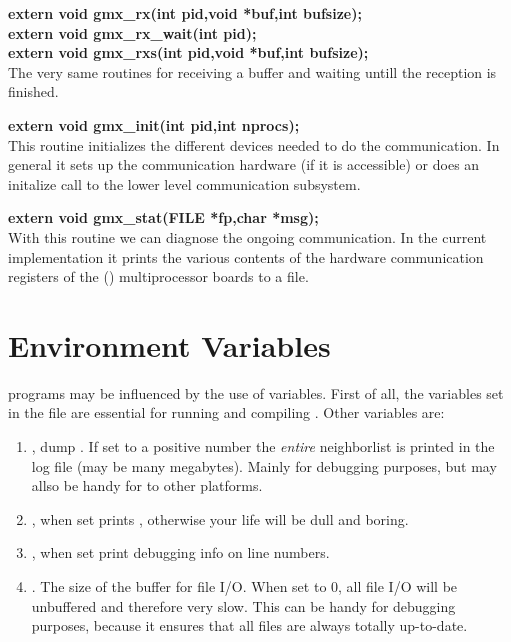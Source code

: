 \smallskip

{\bf extern void gmx\_rx(int pid,void *buf,int bufsize);}\\
{\bf extern void gmx\_rx\_wait(int pid);}\\
{\bf extern void gmx\_rxs(int pid,void *buf,int bufsize);}\\
The very same routines for receiving a buffer and waiting untill the reception is finished.

\smallskip

{\bf extern void gmx\_init(int pid,int nprocs);}\\
This routine initializes the different devices needed to do the communication. In general it sets up the communication hardware (if it is accessible) or does an initalize call to the lower level communication subsystem.

\smallskip

{\bf extern void gmx\_stat(FILE *fp,char *msg);}\\
With this routine we can diagnose the ongoing communication. In the current implementation it prints the various contents of the hardware communication  registers of the (\intel) multiprocessor boards to a file.


\section{Environment Variables}
{\gromacs} programs may be influenced by the use of  
variables. First of all, the variables set in the  file
are essential for running and compiling {\gromacs}. Other variables are:
\begin{enumerate}
\item	{}, dump . 
	If set to a positive number the {\em entire}
	neighborlist is printed in the log file (may be many megabytes).
	Mainly for debugging purposes, but may allso be handy for
	 to other platforms.
\item	{}, when set prints , otherwise
	your {\gromacs} life will be dull and boring.
\item	{}, when set print debugging info on line numbers.
\item	{}. The size of the buffer for file I/O. When set
	to 0, all file I/O will be unbuffered and therefore very slow.
	This can be handy for debugging purposes, because it ensures
	that all files are always totally up-to-date.
\end{enumerate}

